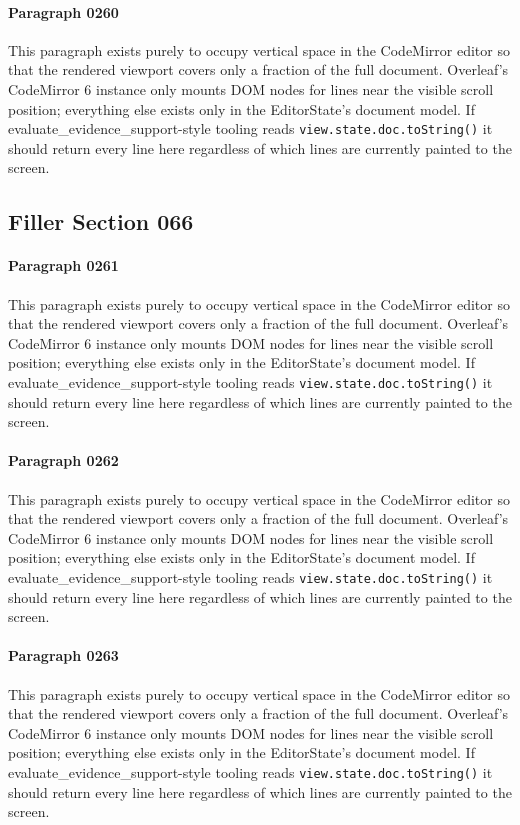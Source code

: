 \documentclass{article}
\begin{document}
\paragraph{Paragraph 0260}
This paragraph exists purely to occupy vertical space in the CodeMirror editor so that the rendered viewport covers only a fraction of the full document. Overleaf's CodeMirror 6 instance only mounts DOM nodes for lines near the visible scroll position; everything else exists only in the EditorState's document model. If evaluate\_evidence\_support-style tooling reads \texttt{view.state.doc.toString()} it should return every line here regardless of which lines are currently painted to the screen.

\subsection{Filler Section 066}
\paragraph{Paragraph 0261}
This paragraph exists purely to occupy vertical space in the CodeMirror editor so that the rendered viewport covers only a fraction of the full document. Overleaf's CodeMirror 6 instance only mounts DOM nodes for lines near the visible scroll position; everything else exists only in the EditorState's document model. If evaluate\_evidence\_support-style tooling reads \texttt{view.state.doc.toString()} it should return every line here regardless of which lines are currently painted to the screen.

\paragraph{Paragraph 0262}
This paragraph exists purely to occupy vertical space in the CodeMirror editor so that the rendered viewport covers only a fraction of the full document. Overleaf's CodeMirror 6 instance only mounts DOM nodes for lines near the visible scroll position; everything else exists only in the EditorState's document model. If evaluate\_evidence\_support-style tooling reads \texttt{view.state.doc.toString()} it should return every line here regardless of which lines are currently painted to the screen.

\paragraph{Paragraph 0263}
This paragraph exists purely to occupy vertical space in the CodeMirror editor so that the rendered viewport covers only a fraction of the full document. Overleaf's CodeMirror 6 instance only mounts DOM nodes for lines near the visible scroll position; everything else exists only in the EditorState's document model. If evaluate\_evidence\_support-style tooling reads \texttt{view.state.doc.toString()} it should return every line here regardless of which lines are currently painted to the screen.
\end{document}
